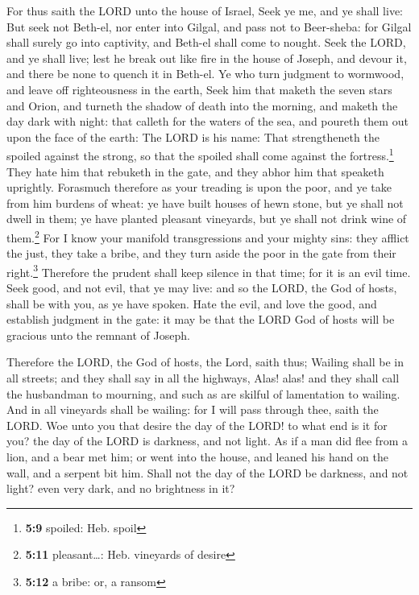  For thus saith the LORD unto the house of Israel, Seek ye
me, and ye shall live:  But seek not Beth-el, nor enter
into Gilgal, and pass not to Beer-sheba: for Gilgal shall surely go into
captivity, and Beth-el shall come to nought.  Seek the
LORD, and ye shall live; lest he break out like fire in the house of
Joseph, and devour it, and there be none to quench it in Beth-el.
 Ye who turn judgment to wormwood, and leave off
righteousness in the earth,  Seek him that maketh the
seven stars and Orion, and turneth the shadow of death into the morning,
and maketh the day dark with night: that calleth for the waters of the
sea, and poureth them out upon the face of the earth: The LORD is his
name:  That strengtheneth the spoiled against the strong,
so that the spoiled shall come against the fortress.\footnote{\textbf{5:9}
  spoiled: Heb. spoil}  They hate him that rebuketh in
the gate, and they abhor him that speaketh uprightly. 
Forasmuch therefore as your treading is upon the poor, and ye take from
him burdens of wheat: ye have built houses of hewn stone, but ye shall
not dwell in them; ye have planted pleasant vineyards, but ye shall not
drink wine of them.\footnote{\textbf{5:11} pleasant\ldots: Heb.
  vineyards of desire}  For I know your manifold
transgressions and your mighty sins: they afflict the just, they take a
bribe, and they turn aside the poor in the gate from their
right.\footnote{\textbf{5:12} a bribe: or, a ransom} 
Therefore the prudent shall keep silence in that time; for it is an evil
time.  Seek good, and not evil, that ye may live: and so
the LORD, the God of hosts, shall be with you, as ye have spoken.
 Hate the evil, and love the good, and establish judgment
in the gate: it may be that the LORD God of hosts will be gracious unto
the remnant of Joseph.

 Therefore the LORD, the God of hosts, the Lord, saith
thus; Wailing shall be in all streets; and they shall say in all the
highways, Alas! alas! and they shall call the husbandman to mourning,
and such as are skilful of lamentation to wailing.  And
in all vineyards shall be wailing: for I will pass through thee, saith
the LORD.  Woe unto you that desire the day of the LORD!
to what end is it for you? the day of the LORD is darkness, and not
light.  As if a man did flee from a lion, and a bear met
him; or went into the house, and leaned his hand on the wall, and a
serpent bit him.  Shall not the day of the LORD be
darkness, and not light? even very dark, and no brightness in it?


